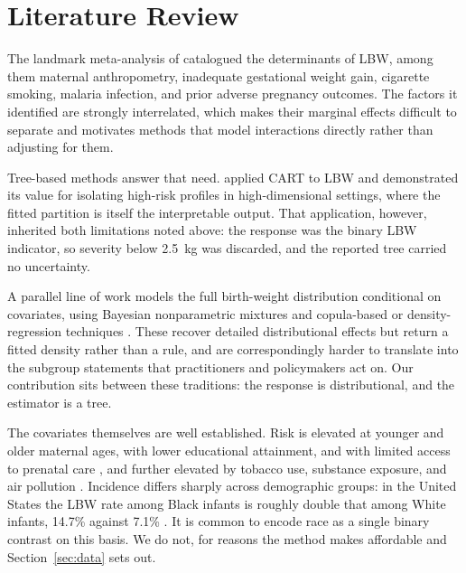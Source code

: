 \section{Literature Review}
\fontsize{12}{14}\selectfont

The landmark meta-analysis of \citet{kramer1987} catalogued the determinants of
LBW, among them maternal anthropometry, inadequate gestational weight gain,
cigarette smoking, malaria infection, and prior adverse pregnancy outcomes. The
factors it identified are strongly interrelated, which makes their marginal
effects difficult to separate and motivates methods that model interactions
directly rather than adjusting for them.

Tree-based methods answer that need. \citet{KITSANTAS2006275} applied CART to
LBW and demonstrated its value for isolating high-risk profiles in
high-dimensional settings, where the fitted partition is itself the
interpretable output. That application, however, inherited both limitations
noted above: the response was the binary LBW indicator, so severity below
2.5~kg was discarded, and the reported tree carried no uncertainty.

A parallel line of work models the full birth-weight distribution conditional
on covariates, using Bayesian nonparametric mixtures \citep{dunson2008} and
copula-based or density-regression techniques \citep{rathjens2023}. These
recover detailed distributional effects but return a fitted density rather than
a rule, and are correspondingly harder to translate into the subgroup
statements that practitioners and policymakers act on. Our contribution sits
between these traditions: the response is distributional, and the estimator is
a tree.

The covariates themselves are well established. Risk is elevated at younger and
older maternal ages, with lower educational attainment, and with limited access
to prenatal care \citep{age_differences_lbw, finch2003, jain2024}, and further
elevated by tobacco use, substance exposure, and air pollution
\citep{standford_med_lbw, lu2020combined}. Incidence differs sharply across
demographic groups: in the United States the LBW rate among Black infants is
roughly double that among White infants, 14.7\% against 7.1\%
\citep{marchofdimes2024}. It is common to encode race as a single binary
contrast on this basis. We do not, for reasons the method makes affordable and
Section~\ref{sec:data} sets out.


